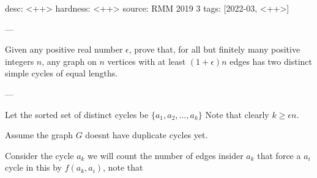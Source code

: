 desc: <++>
hardness: <++>
source: RMM 2019 3
tags: [2022-03, <++>]

---

Given any positive real number $\epsilon$, prove that,
for all but finitely many positive integers $n$, any graph
on $n$ vertices with at least $(1+\epsilon)n$ edges has 
two distinct simple cycles of equal lengths.

---

Let the sorted set of distinct cycles be $\{a_1,a_2,...,a_k\}$
Note that clearly $k \geq \epsilon n$.

Assume the graph $G$ doesnt have duplicate cycles yet.

Consider the cycle $a_k$ we will count the number of 
edges insider $a_k$ that force a $a_i$ cycle in this by $f(a_k,a_i)$, note that




